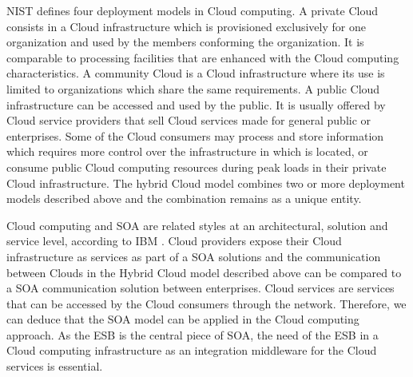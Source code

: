 \ac{NIST} defines four deployment models in Cloud computing. A private Cloud consists in a Cloud infrastructure which is provisioned exclusively for one organization and used by the members conforming the organization. It is comparable to processing facilities that are enhanced with the Cloud computing characteristics. A community Cloud is a Cloud infrastructure where its use is limited to organizations which share the same requirements. A public Cloud infrastructure can be accessed and used by the public. It is usually offered by Cloud service providers that sell Cloud services made for general public or enterprises. Some of the Cloud consumers may process and store information which requires more control over the infrastructure in which is located, or consume public Cloud computing resources during peak loads in their private Cloud infrastructure. The hybrid Cloud model combines two or more deployment models described above and the combination remains as a unique entity.  

Cloud computing and \ac{SOA} are related styles at an architectural, solution and service level, according to IBM \cite{IBM2011}. Cloud providers expose their Cloud infrastructure as services as part of a \ac{SOA} solutions and the communication between Clouds in the Hybrid Cloud model described above can be compared to a SOA communication solution between enterprises. Cloud services are services that can be accessed by the Cloud consumers through the network. Therefore, we can deduce that the SOA model can be applied in the Cloud computing approach. As the \ac{ESB} is the central piece of \ac{SOA}, the need of the \ac{ESB} in a Cloud computing infrastructure as an integration middleware for the Cloud services is essential. 